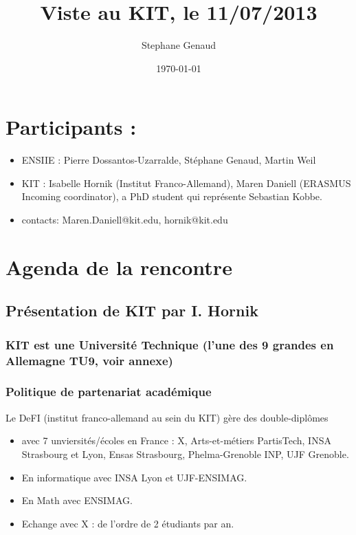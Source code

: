 \documentclass[11pt]{article}
\title{Viste au KIT, le 11/07/2013}
\author{Stephane Genaud}
\date{\today}
\begin{document}
\maketitle

\setcounter{tocdepth}{3}
\tableofcontents
\vspace*{1cm}


\section{Participants :}
\label{sec-1}

\begin{itemize}
\item ENSIIE : Pierre Dossantos-Uzarralde, Stéphane Genaud, Martin Weil
\item KIT : Isabelle Hornik (Institut Franco-Allemand), Maren Daniell (ERASMUS Incoming coordinator), a PhD student qui représente Sebastian Kobbe.
\item contacts: Maren.Daniell@kit.edu, hornik@kit.edu
\end{itemize}
\section{Agenda de la rencontre}
\label{sec-2}
\subsection{Présentation de KIT par I. Hornik}
\label{sec-2-1}
\subsubsection{KIT est une Université Technique (l'une des 9 grandes en Allemagne TU9,  voir annexe)}
\label{sec-2-1-1}
\subsubsection{Politique de partenariat académique}
\label{sec-2-1-2}


Le DeFI (institut franco-allemand au sein du KIT) gère des double-diplômes
\begin{itemize}
\item avec 7 unviersités/écoles en France : X, Arts-et-métiers PartisTech, INSA Strasbourg et Lyon, Ensas Strasbourg, Phelma-Grenoble INP, UJF Grenoble.
\item En informatique avec INSA Lyon et UJF-ENSIMAG.
\item En Math avec ENSIMAG.
\item Echange avec X : de l'ordre de 2 étudiants par an.
\end{itemize}
  
\end{document}
